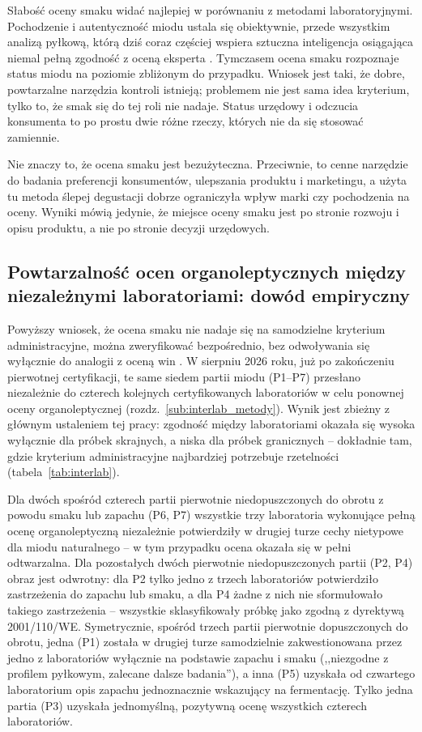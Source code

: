 \documentclass[12pt,a4paper]{article}
\begin{document}
Słabość oceny smaku widać najlepiej w porównaniu z metodami laboratoryjnymi.
Pochodzenie i autentyczność miodu ustala się obiektywnie, przede wszystkim
analizą pyłkową, którą dziś coraz częściej wspiera sztuczna inteligencja
osiągająca niemal pełną zgodność z oceną eksperta \cite{Banach2025}. Tymczasem
ocena smaku rozpoznaje status miodu na poziomie zbliżonym do przypadku. Wniosek
jest taki, że dobre, powtarzalne narzędzia kontroli istnieją; problemem nie jest
sama idea kryterium, tylko to, że smak się do tej roli nie nadaje. Status urzędowy
i odczucia konsumenta to po prostu dwie różne rzeczy, których nie da się stosować
zamiennie.

Nie znaczy to, że ocena smaku jest bezużyteczna. Przeciwnie, to cenne narzędzie
do badania preferencji konsumentów, ulepszania produktu i marketingu, a użyta tu
metoda ślepej degustacji dobrze ograniczyła wpływ marki czy pochodzenia na oceny.
Wyniki mówią jedynie, że miejsce oceny smaku jest po stronie rozwoju i opisu
produktu, a nie po stronie decyzji urzędowych.

\subsection{Powtarzalność ocen organoleptycznych między niezależnymi laboratoriami: dowód empiryczny}
\label{sub:interlab_dyskusja}

Powyższy wniosek, że ocena smaku nie nadaje się na samodzielne kryterium
administracyjne, można zweryfikować bezpośrednio, bez odwoływania się wyłącznie do
analogii z oceną win \cite{hodgson2009concordance}. W sierpniu 2026 roku, już po
zakończeniu pierwotnej certyfikacji, te same siedem partii miodu (P1--P7) przesłano
niezależnie do czterech kolejnych certyfikowanych laboratoriów w celu ponownej oceny
organoleptycznej (rozdz.~\ref{sub:interlab_metody}). Wynik jest zbieżny z głównym
ustaleniem tej pracy: zgodność między laboratoriami okazała się wysoka wyłącznie dla
próbek skrajnych, a niska dla próbek granicznych -- dokładnie tam, gdzie kryterium
administracyjne najbardziej potrzebuje rzetelności (tabela~\ref{tab:interlab}).

Dla dwóch spośród czterech partii pierwotnie niedopuszczonych do obrotu z powodu
smaku lub zapachu (P6, P7) wszystkie trzy laboratoria wykonujące pełną ocenę
organoleptyczną niezależnie potwierdziły w drugiej turze cechy nietypowe dla miodu
naturalnego -- w tym przypadku ocena okazała się w pełni odtwarzalna. Dla pozostałych
dwóch pierwotnie niedopuszczonych partii (P2, P4) obraz jest odwrotny: dla P2 tylko
jedno z trzech laboratoriów potwierdziło zastrzeżenia do zapachu lub smaku, a dla P4
żadne z nich nie sformułowało takiego zastrzeżenia -- wszystkie sklasyfikowały próbkę
jako zgodną z dyrektywą 2001/110/WE. Symetrycznie, spośród trzech partii pierwotnie
dopuszczonych do obrotu, jedna (P1) została w drugiej turze samodzielnie
zakwestionowana przez jedno z laboratoriów wyłącznie na podstawie zapachu i smaku
(,,niezgodne z profilem pyłkowym, zalecane dalsze badania''), a inna (P5) uzyskała od
czwartego laboratorium opis zapachu jednoznacznie wskazujący na fermentację. Tylko
jedna partia (P3) uzyskała jednomyślną, pozytywną ocenę wszystkich czterech
laboratoriów.
\end{document}
